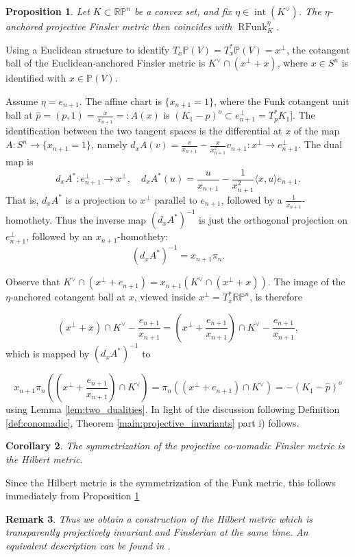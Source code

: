 \documentclass[reqno,10pt]{amsart}
\newtheorem{Proposition}{Proposition}[section]
\newtheorem{Corollary}[Proposition]{Corollary}
\newtheorem{Remark}[Proposition]{Remark}
\DeclareMathOperator{\inter}{int}
\DeclareMathOperator{\RFunk}{RFunk}
\newcommand{\R}{\mathbb{R}}
\begin{document}
\begin{Proposition}\label{prop:projective_funk}
	Let $K\subset \R\mathbb P^n$ be a convex set, and fix $\eta\in \inter(K^\vee)$. The $\eta$-anchored projective Finsler metric then coincides with $\RFunk_K^{\eta}$.
\end{Proposition}

\proof
Using a Euclidean structure to identify $T_x\mathbb P(V)=T_x^*\mathbb P(V)=x^\perp$, the cotangent ball of the Euclidean-anchored Finsler metric is $K^\vee\cap (x^\perp +x)$, where $x\in S^n$ is identified with $x\in \mathbb P(V)$. 

Assume $\eta=e_{n+1}$. The affine chart is $\{x_{n+1}=1\}$, where the Funk cotangent unit ball at $\hat p =(p,1)=\frac{x}{x_{n+1}}=:A(x)$ is $(K_1-p)^o\subset e_{n+1}^\perp=T_p^*K_1]$. The identification between the two tangent spaces is the differential at $x$ of the map $A:S^{n}\to \{x_{n+1}=1\}$, namely $d_xA(v)=\frac{v}{x_{n+1}}-\frac{x}{x_{n+1}^2}v_{n+1}: x^\perp \to e_{n+1}^\perp$.
The dual map is $$d_xA^*:e_{n+1}^\perp \to x^\perp,\quad  d_xA^*(u)=\frac{u}{x_{n+1}}-\frac{1}{x_{n+1}^2}\langle x,u\rangle e_{n+1}. $$
That is, $d_xA^*$ is a projection to $x^\perp$ parallel to $e_{n+1}$, followed by a $\frac{1}{x_{n+1}}$- homothety.
Thus the inverse map $(d_xA^*)^{-1}$ is just the orthogonal projection on $e_{n+1}^\perp$, followed by an $x_{n+1}$-homothety: 
$$(d_xA^*)^{-1}=x_{n+1}\pi_n.$$

Observe that $K^\vee\cap (x^\perp +e_{n+1})=x_{n+1}(K^\vee\cap (x^\perp +x))$. The image of the $\eta$-anchored cotangent ball at $x$, viewed inside $x^\perp=T_x^*\R\mathbb P^n$, is therefore

$$(x^\perp +x)\cap K^\vee -\frac{e_{n+1}}{x_{n+1}} = (x^\perp +\frac{e_{n+1}}{x_{n+1}})\cap K^\vee -\frac{e_{n+1}}{x_{n+1}}, $$
which is mapped by $(d_xA^*)^{-1}$ to 

$$ x_{n+1}\pi_n ((x^\perp +\frac{e_{n+1}}{x_{n+1}})\cap K^\vee ) =\pi _n((x^\perp+e_{n+1})\cap K^\vee)= -(K_1-\hat p)^o$$ 
using Lemma \ref{lem:two_dualities}.
\endproof
In light of the discussion following Definition \ref{def:conomadic}, Theorem \ref{main:projective_invariants} part i) follows.

\begin{Corollary}
	The symmetrization of the projective co-nomadic Finsler metric is the Hilbert metric.
\end{Corollary}
\proof
Since the Hilbert metric is the symmetrization of the Funk metric, this follows immediately from Proposition \ref{prop:projective_funk}
\endproof
\begin{Remark}
	Thus we obtain a construction of the Hilbert metric which is transparently projectively invariant and Finslerian at the same time. An equivalent description can be found in \cite[section 3]{vernicos_yang}.
\end{Remark} 
\end{document}
